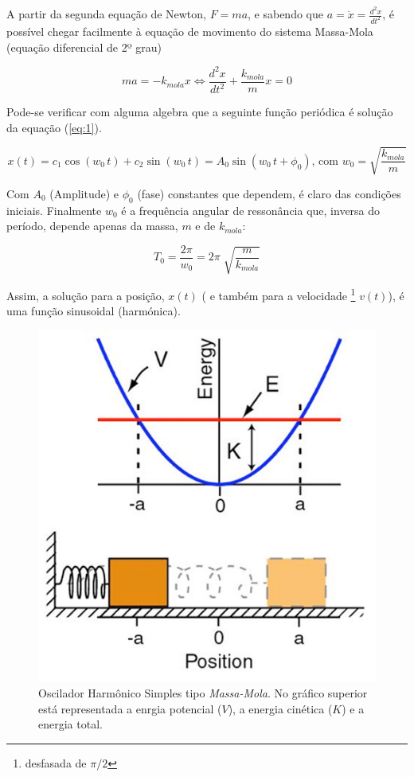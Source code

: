 \documentclass[a4paper,twoside,12pt]{article}      %
\begin{document}
A partir da segunda equação de Newton, $F=m a$, e sabendo que $ a = \ddot{x}= \frac{d^2 x}{dt^2}$, é possível chegar facilmente  à equação de movimento do sistema Massa-Mola (equação diferencial de 2º grau)

\begin{equation}
	\label{eq:1} 
 m a = - k_{mola} x \Leftrightarrow \frac{d^2 x}{dt^2}  + \frac{k_{mola}}{m} x = 0
\end{equation}

Pode-se verificar com alguma algebra que a seguinte função  periódica é solução da equação (\ref{eq:1}).

\begin{equation}
	\label{eq:solu_mola}
x(t) = c_1 \cos(w_0 \, t) + c_2 \sin(w_0 \, t) = A_0 \sin(w_0 \, t + \phi_0) \text{, com } w_0 = \sqrt{\frac{k_{mola}}{m}}
\end{equation}

Com $ A_0 $ (Amplitude) e $\phi_0$ (fase) constantes que dependem, é claro  das condições iniciais. Finalmente $w_0$ é a frequência angular de ressonância que, inversa do período, depende apenas da massa, $m$ e de $k_{mola}$:

\begin{equation}
	\label{eq:period_mola}
T_0 = \frac{2 \pi}{w_0} = 2\pi\; \sqrt{\frac{m}{k_{mola}}}	
\end{equation}

Assim, a solução para a posição, $x(t)$ ( e também para a velocidade \footnote{desfasada de $\pi/2$} $v(t)$), é uma função sinusoidal (harmónica).

\begin{figure}
	[!tbp] \centering 
	\includegraphics[width=0.5	\textwidth]{simple_harmonic_oscillator} 
	\caption{Oscilador Harmônico Simples tipo \emph{Massa-Mola}. No gráfico superior está representada a enrgia  potencial ($V$), a energia cinética ($K$) e a energia total.  \label{fig:2}} 
\end{figure}
\end{document}
